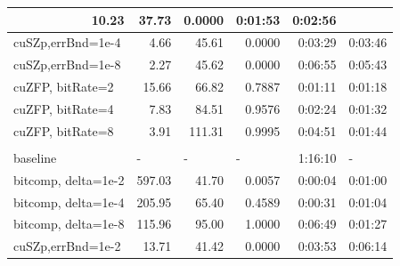 \documentclass[Ingles,Final]{ic-tese-v3}
\begin{document}
\begin{table}[h!]
\begin{tabular}{|lrrrrr|}
  \multicolumn{1}{r|}{10.23} &
  \multicolumn{1}{r|}{37.73} &
  \multicolumn{1}{r|}{0.0000} &
  \multicolumn{1}{r|}{0:01:53} &
  0:02:56 \\ \hline
\multicolumn{1}{|l|}{cuSZp,errBnd=1e-4} &
  \multicolumn{1}{r|}{4.66} &
  \multicolumn{1}{r|}{45.61} &
  \multicolumn{1}{r|}{0.0000} &
  \multicolumn{1}{r|}{0:03:29} &
  0:03:46 \\ \hline
\multicolumn{1}{|l|}{cuSZp,errBnd=1e-8} &
  \multicolumn{1}{r|}{2.27} &
  \multicolumn{1}{r|}{45.62} &
  \multicolumn{1}{r|}{0.0000} &
  \multicolumn{1}{r|}{0:06:55} &
  0:05:43 \\ \hline
\multicolumn{1}{|l|}{cuZFP, bitRate=2} &
  \multicolumn{1}{r|}{15.66} &
  \multicolumn{1}{r|}{66.82} &
  \multicolumn{1}{r|}{0.7887} &
  \multicolumn{1}{r|}{0:01:11} &
  0:01:18 \\ \hline
\multicolumn{1}{|l|}{cuZFP, bitRate=4} &
  \multicolumn{1}{r|}{7.83} &
  \multicolumn{1}{r|}{84.51} &
  \multicolumn{1}{r|}{0.9576} &
  \multicolumn{1}{r|}{0:02:24} &
  0:01:32 \\ \hline
\multicolumn{1}{|l|}{cuZFP, bitRate=8} &
  \multicolumn{1}{r|}{3.91} &
  \multicolumn{1}{r|}{111.31} &
  \multicolumn{1}{r|}{0.9995} &
  \multicolumn{1}{r|}{0:04:51} &
  0:01:44 \\ \hline
\rowcolor[HTML]{C0C0C0} 
\multicolumn{6}{|l|}{\cellcolor[HTML]{C0C0C0}\textbf{Marmousi3D}} \\ \hline
\multicolumn{1}{|l|}{baseline} &
  \multicolumn{1}{l|}{-} &
  \multicolumn{1}{l|}{-} &
  \multicolumn{1}{l|}{-} &
  \multicolumn{1}{r|}{1:16:10} &
  \multicolumn{1}{l|}{-} \\ \hline
\multicolumn{1}{|l|}{bitcomp, delta=1e-2} &
  \multicolumn{1}{r|}{597.03} &
  \multicolumn{1}{r|}{41.70} &
  \multicolumn{1}{r|}{0.0057} &
  \multicolumn{1}{r|}{0:00:04} &
  0:01:00 \\ \hline
\multicolumn{1}{|l|}{bitcomp, delta=1e-4} &
  \multicolumn{1}{r|}{205.95} &
  \multicolumn{1}{r|}{65.40} &
  \multicolumn{1}{r|}{0.4589} &
  \multicolumn{1}{r|}{0:00:31} &
  0:01:04 \\ \hline
\multicolumn{1}{|l|}{bitcomp, delta=1e-8} &
  \multicolumn{1}{r|}{115.96} &
  \multicolumn{1}{r|}{95.00} &
  \multicolumn{1}{r|}{1.0000} &
  \multicolumn{1}{r|}{0:06:49} &
  0:01:27 \\ \hline
\multicolumn{1}{|l|}{cuSZp,errBnd=1e-2} &
  \multicolumn{1}{r|}{13.71} &
  \multicolumn{1}{r|}{41.42} &
  \multicolumn{1}{r|}{0.0000} &
  \multicolumn{1}{r|}{0:03:53} &
  0:06:14 \\ \hline

\end{tabular}
\end{table}
\end{document}

